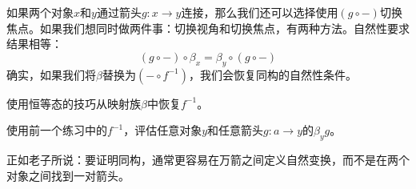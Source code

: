 \documentclass[DaoFP]{subfiles}
\begin{document}
如果两个对象$x$和$y$通过箭头$g \colon x \to y$连接，那么我们还可以选择使用$(g \circ -)$切换焦点。如果我们想同时做两件事：切换视角和切换焦点，有两种方法。自然性要求结果相等：
\[ (g \circ -) \circ \beta_x = \beta_y \circ (g \circ -) \]
确实，如果我们将$\beta$替换为$(- \circ f^{-1})$，我们会恢复同构的自然性条件。

\begin{exercise}
使用恒等态的技巧从映射族$\beta$中恢复$f^{-1}$。
\end{exercise}
\begin{exercise}
使用前一个练习中的$f^{-1}$，评估任意对象$y$和任意箭头$g \colon a \to y$的$\beta_y g$。
\end{exercise}


正如老子所说：要证明同构，通常更容易在万箭之间定义自然变换，而不是在两个对象之间找到一对箭头。
\end{document}
